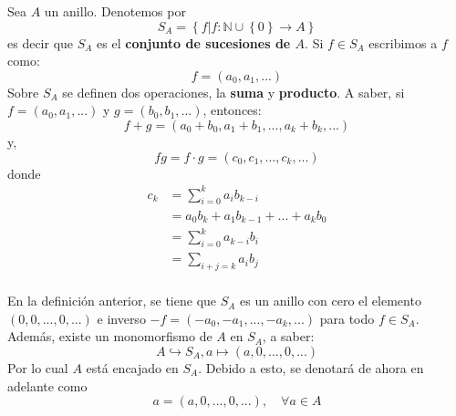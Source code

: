 \documentclass[12pt]{report}
\theoremstyle{largebreak}
\newcommand\cf[3]{\ensuremath{#1:#2\rightarrow#3}}
\begin{document}
    \begin{mydef}
        Sea $A$ un anillo. Denotemos por
        \begin{equation*}
            S_A=\left\{f\Big|\cf{f}{\mathbb{N}\cup\left\{0\right\}}{A} \right\}
        \end{equation*}
        es decir que $S_A$ es el \textbf{conjunto de sucesiones de $A$}. Si $f\in S_A$ escribimos a $f$ como:
        \begin{equation*}
            f=(a_0,a_1,...)
        \end{equation*}
        Sobre $S_A$ se definen dos operaciones, la \textbf{suma} y \textbf{producto}. A saber, si $f=(a_0,a_1,...)$ y $g=(b_0,b_1,...)$, entonces:
        \begin{equation*}
            f+g=(a_0+b_0,a_1+b_1,...,a_k+b_k,...)
        \end{equation*}
        y,
        \begin{equation*}
            fg = f\cdot g = (c_0,c_1,...,c_k,...)
        \end{equation*}
        donde
        \begin{equation*}
            \begin{split}
                c_k&=\sum_{ i=0}^k a_ib_{ k-i}\\
                &=a_0b_k+a_1b_{ k-1}+...+a_kb_0\\
                &=\sum_{ i=0}^k a_{k-i}b_{i}\\
                &=\sum_{ i+j=k}a_ib_j\\
            \end{split}
        \end{equation*}
    \end{mydef}

    \begin{obs}
        En la definición anterior, se tiene que $S_A$ es un anillo con cero el elemento $(0,0,...,0,...)$ e inverso $-f=(-a_0,-a_1,...,-a_k,...)$ para todo $f\in S_A$. Además, existe un monomorfismo de $A$ en $S_A$, a saber:
        \begin{equation*}
            A\hookrightarrow S_A, a\mapsto (a,0,...,0,...)
        \end{equation*}
        Por lo cual $A$ está encajado en $S_A$. Debido a esto, se denotará de ahora en adelante como
        \begin{equation*}
            a=(a,0,...,0,...),\quad\forall a\in A
        \end{equation*}
    \end{obs}
\end{document}
